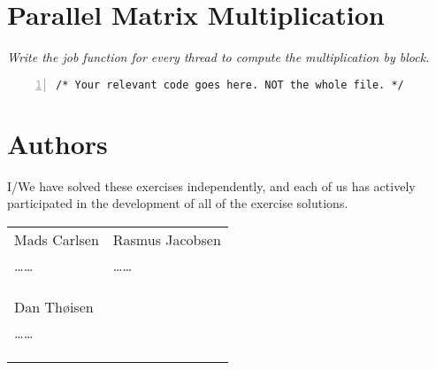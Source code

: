 \documentclass{article}
\begin{document}
\section{Parallel Matrix Multiplication}

\begin{ExerciseList}
\Exercise
{}
\Question
\emph{Write the job function for every thread to compute the
  multiplication by block.}

\begin{lstlisting}[basicstyle=\small\sffamily,
keywords={break,case,const,continue,default,else,enum,
for,if,return,switch,while,do,long,void,int,float,double,
char,struct,typedef,include,size\_t},
keywordstyle={\color{blue}},
comment={[l]{//}}, morecomment={[s]{/*}{*/}}, commentstyle=\itshape,
columns={[l]flexible}, numbers=left, numberstyle=\tiny,
frameround=fftt, frame=shadowbox, captionpos=b,
caption={Parallelized matrix multiplication by block.},
label=LST:blockmatmult]
/* Your relevant code goes here. NOT the whole file. */
\end{lstlisting}

\end{ExerciseList}


\newpage
\section{Authors}
I/We have solved these exercises independently, and each of us has actively
participated in the development of all of the exercise solutions.
\vspace{1cm}

\noindent
\begin{tabular}{p{70mm}p{70mm}}

%
%

Mads Carlsen & Rasmus Jacobsen \\
\dots\dotfill\dots & \dots\dotfill\dots \\
 &  \\
& \\
& \\

Dan Thøisen &  \\
\dots\dotfill\dots &  \\
&  \\
& \\
& \\
\end{tabular}
\end{document}
